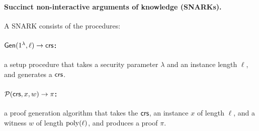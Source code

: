 
\paragraph{Succinct non-interactive arguments of knowledge (SNARKs).}
A SNARK consists of the procedures:
\vspace{-1ex}
\paragraph{$\mathsf{Gen}(1^\lambda, \ell)\to \mathsf{crs}$:} a setup procedure that takes a security parameter $\lambda$
		and an instance length $\ell$, and generates a $\mathsf{crs}$.
\vspace{-1ex}
\paragraph{$\mathcal{P}(\mathsf{crs}, x, w)\to \pi$:} a proof generation algorithm that takes the $\mathsf{crs}$, an instance $x$ of length $\ell$,
		and a witness $w$ of length $\operatorname{poly}(\ell)$,
		and produces a proof $\pi$.
\vspace{-1ex}
